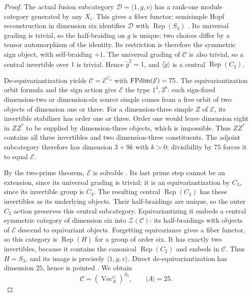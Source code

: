 \begin{proof}
The actual fusion subcategory $\mathcal D=\langle1,g,v\rangle$ has a
rank-one module category generated by any $X_i$. This gives a fiber
functor; semisimple Hopf reconstruction in dimension six identifies
$\mathcal D$ with $\operatorname{Rep}(S_3)$ \cite{EGpq}.
Its universal grading is trivial, so the half-braiding on $g$ is unique:
two choices differ by a tensor automorphism of the identity. Its
restriction is therefore the symmetric sign object, with self-braiding
$+1$. The universal grading of $\mathcal C$ is also trivial, so a
central invertible over $1$ is trivial. Hence $\widetilde g^2=1$, and
$\langle\widetilde g\rangle$ is a central
$\operatorname{Rep}(C_2)$.

De-equivariantization yields
$\mathcal C=\mathcal E^{C_2}$ with $\operatorname{FPdim}(\mathcal E)=75$.
The equivariantization orbit formula \cite{BurciuNatale} and the
sign action give $\mathcal E$ the type $1^3,3^8$: each sign-fixed
dimension-two or dimension-six source simple comes from a free orbit
of two objects of dimension one or three. For a dimension-three simple
$Z$ of $\mathcal E$, its invertible stabilizer has order one or three.
Order one would leave dimension eight in $ZZ^*$ to be supplied by
dimension-three objects, which is impossible. Thus $ZZ^*$ contains all
three invertibles and two dimension-three constituents.
The adjoint subcategory therefore has dimension $3+9k$ with $k>0$;
divisibility by $75$ forces it to equal $\mathcal E$.

By the two-prime theorem, $\mathcal E$ is solvable
\cite[Theorem~1.6]{ENOSolvable}. Its last prime step cannot be an
extension, since its universal grading is trivial; it is an
equivariantization by $C_3$, since its invertible group is $C_3$.
The resulting central $\operatorname{Rep}(C_3)$ has these invertibles
as its underlying objects. Their half-braidings are unique, so the
outer $C_2$ action preserves this central subcategory.
Equivariantizing it embeds a central symmetric category of dimension
six into $\mathcal Z(\mathcal C)$: its half-braidings with objects of
$\mathcal E$ descend to equivariant objects. Forgetting equivariance
gives a fiber functor, so this category is $\operatorname{Rep}(H)$ for
a group of order six. It has exactly two invertibles, because it
contains the canonical $\operatorname{Rep}(C_2)$ and embeds in
$\mathcal C$. Thus $H=S_3$, and its image is precisely
$\langle1,g,v\rangle$.
Direct de-equivariantization has dimension $25$, hence is pointed
\cite{ENO,EGO}. We obtain
\[
\mathcal C=(\operatorname{Vec}_A^\omega)^{S_3},\qquad |A|=25.
\]


\end{proof}

